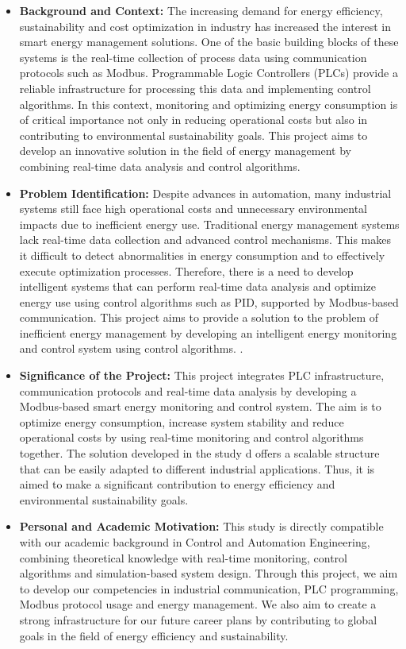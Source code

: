 \begin{itemize}
    \item \textbf{Background and Context:}
    The increasing demand for energy efficiency, sustainability and cost optimization in industry has increased the interest in smart energy management solutions. One of the basic building blocks of these systems is the real-time collection of process data using communication protocols such as Modbus. Programmable Logic Controllers (PLCs) provide a reliable infrastructure for processing this data and implementing control algorithms. In this context, monitoring and optimizing energy consumption is of critical importance not only in reducing operational costs but also in contributing to environmental sustainability goals. This project aims to develop an innovative solution in the field of energy management by combining real-time data analysis and control algorithms.
    \item \textbf{Problem Identification:}
    Despite advances in automation, many industrial systems still face high operational costs and unnecessary environmental impacts due to inefficient energy use. Traditional energy management systems lack real-time data collection and advanced control mechanisms. This makes it difficult to detect abnormalities in energy consumption and to effectively execute optimization processes. Therefore, there is a need to develop intelligent systems that can perform real-time data analysis and optimize energy use using control algorithms such as PID, supported by Modbus-based communication. This project aims to provide a solution to the problem of inefficient energy management by developing an intelligent energy monitoring and control system using control algorithms. .
    \item \textbf{Significance of the Project:}
     This project integrates PLC infrastructure, communication protocols and real-time data analysis by developing a Modbus-based smart energy monitoring and control system. The aim is to optimize energy consumption, increase system stability and reduce operational costs by using real-time monitoring and control algorithms together. The solution developed in the study d offers a scalable structure that can be easily adapted to different industrial applications. Thus, it is aimed to make a significant contribution to energy efficiency and environmental sustainability goals.
    \item \textbf{Personal and Academic Motivation:}
    This study is directly compatible with our academic background in Control and Automation Engineering, combining theoretical knowledge with real-time monitoring, control algorithms and simulation-based system design. Through this project, we aim to develop our competencies in industrial communication, PLC programming, Modbus protocol usage and energy management. We also aim to create a strong infrastructure for our future career plans by contributing to global goals in the field of energy efficiency and sustainability.
\end{itemize}

